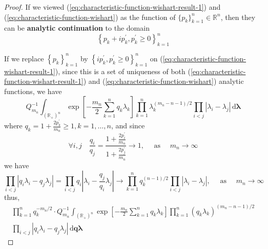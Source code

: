 \begin{proof}
    If we viewed (\ref{eq:characteristic-function-wishart-result-1}) and (\ref{eq:characteristic-function-wishart}) as the function of $\{p_{k}\}_{k=1}^{n}\in\mathbb{R}^{n}$, then they can be \textbf{analytic continuation} to the domain
    \begin{equation*}
        \left\{p_{k}+i p_{k}^{\prime},p_{k}^{\prime}\geq 0\right\}_{k=1}^{n}
    \end{equation*}

    If we replace $\left\{p_{k}\right\}_{k=1}^{n}$ by $\left\{ip_{k}^{\prime},p_{k}^{\prime}\geq 0\right\}_{k=1}^{n}$ on (\ref{eq:characteristic-function-wishart-result-1}), since this is a set of uniqueness of both (\ref{eq:characteristic-function-wishart-result-1}) and (\ref{eq:characteristic-function-wishart}) analytic functions, we have
    \begin{equation*}
        Q_{m_{n}}^{-1}\int_{\left(\mathbb{R}_{+}\right)^{n}}\exp\left[-\frac{m_{n}}{2}\sum_{k=1}^{n}q_{k}\lambda_{k}\right]\prod_{k=1}^{n}\lambda_{k}^{(m_{n}-n-1)/2}\prod_{i<j}\left|\lambda_{i}-\lambda_{j}\right|\,\mathrm{d}\boldsymbol{\lambda}
    \end{equation*}
    where $q_{k}=1+\frac{2p_{k}^{\prime}}{m_{n}}\geq 1,k=1,\ldots,n$, and since
    \begin{equation*}
        \forall i,j\quad\frac{q_{i}}{q_{j}}=\frac{1+\frac{2p_{i}^{\prime}}{m_{n}}}{1+\frac{2p_{j}^{\prime}}{m_{n}}}\rightarrow 1,\quad\text{ as }\quad m_{n}\rightarrow\infty
    \end{equation*}
    we have
    \begin{equation*}
        \prod_{i<j}\left|q_{i}\lambda_{i}-q_{j}\lambda_{j}\right|=\prod_{i<j}q_{i}\left|\lambda_{i}-\frac{q_{j}}{q_{i}}\lambda_{j}\right|\rightarrow\prod_{k=1}^{n}q_{k}^{(n-1)/2}\prod_{i<j}\left|\lambda_{i}-\lambda_{j}\right|,\quad\text{ as }\quad m_{n}\rightarrow\infty
    \end{equation*}
    thus,
    \begin{equation*}
        \begin{array}{c}
            \prod_{k=1}^{n}q_{k}^{-m_{n}/2}\cdot Q_{m_{n}}^{-1}\int_{\left(\mathbb{R}_{+}\right)^{n}}\exp\left[-\frac{m_{n}}{2}\sum_{k=1}^{n}q_{k}\lambda_{k}\right]\prod_{k=1}^{n}\left(q_{k}\lambda_{k}\right)^{(m_{n}-n-1)/2} \\
            \prod_{i<j}\left|q_{i}\lambda_{i}-q_{j}\lambda_{j}\right|\,\mathrm{d}\mathbf{q}\boldsymbol{\lambda}
        \end{array}
    \end{equation*}

\end{proof}
